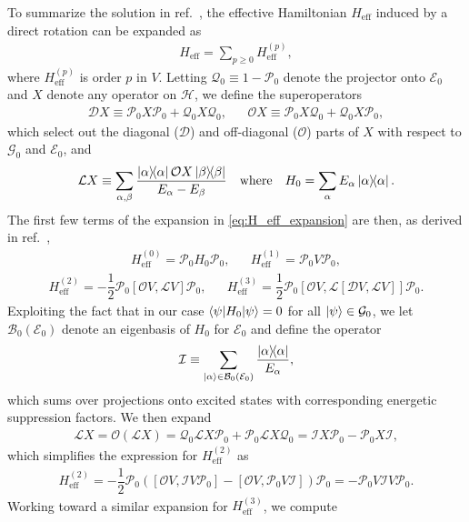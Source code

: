 \documentclass[preprint,showkeys,nofootinbib]{revtex4-1}
\renewcommand{\t}{\text} %
\newcommand{\f}{\dfrac} %
\newcommand{\p}[1]{\left(#1\right)} %
\renewcommand{\sp}[1]{\left[#1\right]} %
\newcommand{\bk}{\braket} %
\newcommand{\B}{\mathcal{B}}
\newcommand{\D}{\mathcal{D}}
\newcommand{\E}{\mathcal{E}}
\newcommand{\G}{\mathcal{G}}
\renewcommand{\H}{\mathcal{H}}
\newcommand{\I}{\mathcal{I}}
\renewcommand{\L}{\mathcal{L}}
\renewcommand{\O}{\mathcal{O}}
\renewcommand{\P}{\mathcal{P}}
\newcommand{\Q}{\mathcal{Q}}
\newcommand{\1}{\mathds{1}}
\begin{document}
To summarize the solution in ref.~\cite{bravyi2011schrieffer}, the
effective Hamiltonian $H_{\t{eff}}$ induced by a direct rotation can
be expanded as
\begin{align}
  H_{\t{eff}} = \sum_{p\ge0} H_{\t{eff}}^{(p)},
  \label{eq:H_eff_expansion}
\end{align}
where $H_{\t{eff}}^{(p)}$ is order $p$ in $V$.  Letting
$\Q_0\equiv1-\P_0$ denote the projector onto $\E_0$ and $X$ denote any
operator on $\H$, we define the superoperators
\begin{align}
  \D X \equiv \P_0 X \P_0 + \Q_0 X \Q_0,
  &&
  \O X \equiv \P_0 X \Q_0 + \Q_0 X \P_0,
\end{align}
which select out the diagonal ($\D$) and off-diagonal ($\O$) parts of
$X$ with respect to $\G_0$ and $\E_0$, and
\begin{align}
  \L X \equiv \sum_{\alpha,\beta}
  \f{\op\alpha \O X \op\beta}{E_\alpha - E_\beta}
  &&
  \t{where}
  &&
  H_0 = \sum_\alpha E_\alpha \op\alpha.
\end{align}
The first few terms of the expansion in \eqref{eq:H_eff_expansion} are
then, as derived in ref.~\cite{bravyi2011schrieffer},
\begin{align}
  H_{\t{eff}}^{(0)} = \P_0 H_0 \P_0,
  &&
  H_{\t{eff}}^{(1)} = \P_0 V \P_0,
  \label{eq:H_eff_0_1}
\end{align}
\begin{align}
  H_{\t{eff}}^{(2)} = - \f12 \P_0 \sp{\O V,\L V} \P_0,
  &&
  H_{\t{eff}}^{(3)} = \f12 \P_0 \sp{\O V, \L \sp{\D V, \L V}} \P_0.
\end{align}
Exploiting the fact that in our case $\bk{\psi|H_0|\psi}=0$ for all
$\ket\psi\in\G_0$, we let $\B_0\p{\E_0}$ denote an eigenbasis of $H_0$
for $\E_0$ and define the operator
\begin{align}
  \I \equiv \sum_{\ket\alpha\in\B_0\p{\E_0}}\f{\op\alpha}{E_\alpha},
\end{align}
which sums over projections onto excited states with corresponding
energetic suppression factors.  We then expand
\begin{align}
  \L X = \O\p{\L X} = \Q_0 \L X \P_0 + \P_0 \L X \Q_0
  = \I X \P_0 - \P_0 X \I,
\end{align}
which simplifies the expression for $H_{\t{eff}}^{(2)}$ as
\begin{align}
  H_{\t{eff}}^{(2)}
  = - \f12 \P_0 \p{\sp{\O V, \I V \P_0}
    - \sp{\O V, \P_0 V \I}} \P_0
  = - \P_0 V \I V \P_0.
  \label{eq:H_eff_2}
\end{align}
Working toward a similar expansion for $H_{\t{eff}}^{(3)}$, we compute
\end{document}

